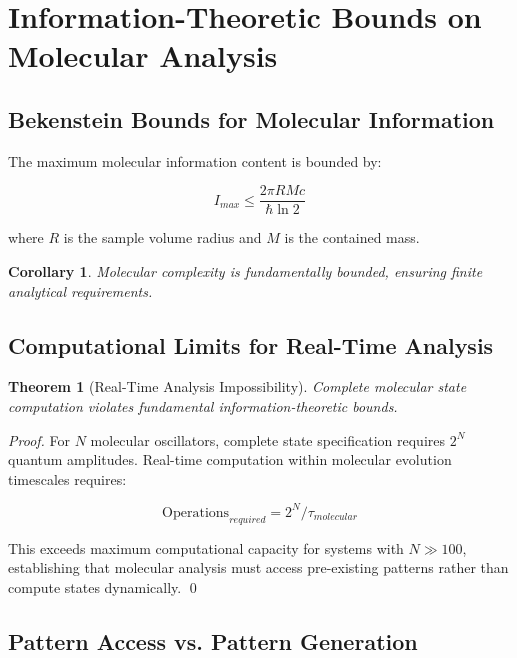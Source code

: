 \documentclass[11pt,a4paper]{article}
\newtheorem{theorem}{Theorem}
\newtheorem{corollary}{Corollary}
\begin{document}
\section{Information-Theoretic Bounds on Molecular Analysis}

\subsection{Bekenstein Bounds for Molecular Information}

The maximum molecular information content is bounded by:

\begin{equation}
I_{max} \leq \frac{2\pi R M c}{\hbar \ln 2}
\end{equation}

where $R$ is the sample volume radius and $M$ is the contained mass.

\begin{corollary}
Molecular complexity is fundamentally bounded, ensuring finite analytical requirements.
\end{corollary}

\subsection{Computational Limits for Real-Time Analysis}

\begin{theorem}[Real-Time Analysis Impossibility]
Complete molecular state computation violates fundamental information-theoretic bounds.
\end{theorem}

\begin{proof}
For $N$ molecular oscillators, complete state specification requires $2^N$ quantum amplitudes. Real-time computation within molecular evolution timescales requires:

\begin{equation}
\text{Operations}_{required} = 2^N / \tau_{molecular}
\end{equation}

This exceeds maximum computational capacity for systems with $N \gg 100$, establishing that molecular analysis must access pre-existing patterns rather than compute states dynamically. \qed
\end{proof}

\subsection{Pattern Access vs. Pattern Generation}
\end{document}
